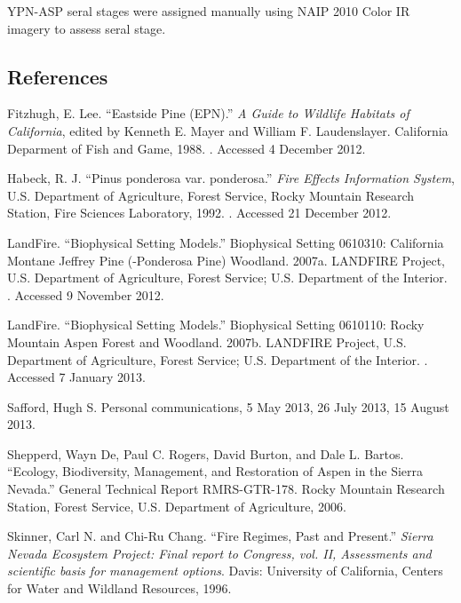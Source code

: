 YPN-ASP seral stages were assigned manually using NAIP 2010 Color IR imagery to assess seral stage.



\clearpage

\subsection*{References}

\begin{hangparas}{.25in}{1} 

Fitzhugh, E. Lee. ``Eastside Pine (EPN).'' \emph{A Guide to Wildlife Habitats of California}, edited by Kenneth E. Mayer and William F. Laudenslayer. California Deparment of Fish and Game, 1988. . Accessed 4 December 2012.

Habeck, R. J. ``Pinus ponderosa var. ponderosa.'' \emph{Fire Effects Information System}, U.S. Department of Agriculture, Forest Service,  Rocky Mountain Research Station, Fire Sciences Laboratory, 1992. . Accessed 21 December 2012.

LandFire. ``Biophysical Setting Models.'' Biophysical Setting 0610310: California Montane Jeffrey Pine (-Ponderosa Pine) Woodland. 2007a. LANDFIRE Project, U.S. Department of Agriculture, Forest Service; U.S. Department of the Interior. . Accessed 9 November 2012.

LandFire. ``Biophysical Setting Models.'' Biophysical Setting 0610110: Rocky Mountain Aspen Forest and Woodland. 2007b. LANDFIRE Project, U.S. Department of Agriculture, Forest Service; U.S. Department of the Interior. . Accessed 7 January 2013.

Safford, Hugh S. Personal communications, 5 May 2013, 26 July 2013, 15 August 2013.

Shepperd, Wayn De, Paul C. Rogers, David Burton, and Dale L. Bartos. ``Ecology, Biodiversity, Management, and Restoration of Aspen in the Sierra Nevada.'' General Technical Report RMRS-GTR-178. Rocky Mountain Research Station, Forest Service, U.S. Department of Agriculture, 2006.

Skinner, Carl N. and Chi-Ru Chang. ``Fire Regimes, Past and Present.'' \emph{Sierra Nevada Ecosystem Project: Final report to Congress, vol. II, Assessments and scientific basis for management options}. Davis: University of California, Centers for Water and Wildland Resources, 1996.


\end{hangparas}
